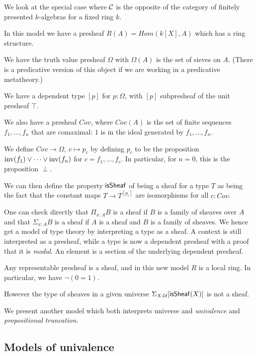 We look at the special case where $\mathcal{C}$ is the opposite of the category of finitely presented $k$-algebras for a fixed
ring $k$.

    In this model we have a presheaf $R(A) = Hom(k[X],A)$ which has a ring structure.

    We have the truth value presheaf $\Omega$ with $\Omega(A)$ is the set of sieves on $A$.
    (There is a predicative version of this object if we are working in a predicative metatheory.)

    We have a dependent type $[p]$ for $p:\Omega$, with $[p]$ subpresheaf of the unit presheaf $\top$.

    We also have a presheaf $Cov$, where $Cov(A)$ is the set of finite sequences $f_1,\dots,f_n$ that are comaximal: $1$ is in the
    ideal generated by $f_1,\dots,f_n$.

    We define $Cov\rightarrow\Omega,~c\mapsto p_c$ by defining $p_c$ to be the proposition $\mathrm{inv}(f_1)\vee\dots\vee\mathrm{inv}(f_n)$
    for $c = f_1,\dots,f_c$. In particular, for $n=0$, this is the proposition $\perp$.

    We can then define the property $\mathsf{isSheaf}$ of being a sheaf for a type $T$ as being the fact that
    the constant maps $T\rightarrow T^{[p_c]}$ are isomorphisms for all $c:Cov$.

    \medskip

    One can check directly that $\Pi_{x:A}B$ is a sheaf if $B$ is a family of sheaves over $A$
    and that $\Sigma_{x:A}B$ is a sheaf if $A$ is a sheaf and $B$ is a family of sheaves. We hence get a model of type theory
    by interpreting a type as a sheaf. A context is still interpreted as a presheaf, while a type is now a dependent presheaf
    with a proof that it is {\em modal}. An element is a section of the underlying dependent presheaf.

    \medskip

    Any representable presheaf is a sheaf, and in this new model $R$ is a local ring. In particular, we have $\neg (0 = 1)$.
    
    \medskip

    However the type of sheaves in a given universe $\Sigma_{X:\mathcal{U}}[\mathsf{isSheaf}(X)]$ is not a sheaf.

    We present another model which both interprets universe and {\em univalence} and {\em propositional truncation}.

\subsection{Models of univalence}

